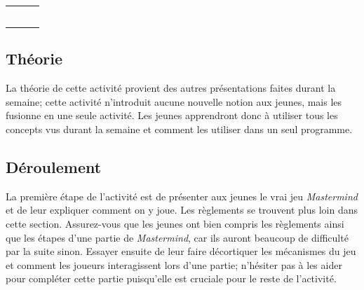 \documentclass[]{report}
\begin{document}
\begin{adjustwidth}{1.5cm}{0cm}
\vspace{1cm}

\begin{center}
\begin{tabular}{ccc} 
 & & \\  
\\  
 & & \\  
\\  
 & &  \\  
\end{tabular}
\end{center}

\subsection*{\Large{Théorie}}
\vspace{-5mm}\makebox[0.917\textwidth]{\hrulefill}\vspace{3mm}

La théorie de cette activité provient des autres présentations faites durant la semaine; cette activité n'introduit aucune nouvelle notion aux jeunes, mais les fusionne en une seule activité. Les jeunes apprendront donc à utiliser tous les concepts vus durant la semaine et comment les utiliser dans un seul programme.


\subsection*{\Large{Déroulement}}
\vspace{-5mm}\makebox[0.917\textwidth]{\hrulefill}\vspace{3mm}

La première étape de l'activité est de présenter aux jeunes le vrai jeu \textit{Mastermind} et de leur expliquer comment on y joue. Les règlements se trouvent plus loin dans cette section. Assurez-vous que les jeunes ont bien compris les règlements ainsi que les étapes d'une partie de \textit{Mastermind}, car ils auront beaucoup de difficulté par la suite sinon. Essayer ensuite de leur faire décortiquer les mécanismes du jeu et comment les joueurs interagissent lors d'une partie; n'hésiter pas à les aider pour compléter cette partie puisqu'elle est cruciale pour le reste de l'activité.
\\


\end{adjustwidth}
\end{document}
